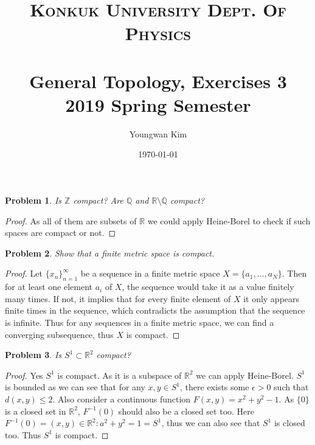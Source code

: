 \documentclass[paper=a4, fontsize=11pt]{scrartcl}
\title{	
	\normalfont \normalsize 
	\textsc{Konkuk University Dept. Of Physics} \\ [25pt] %
	\horrule{1pt} \\[0.4cm] 
	\huge General Topology, Exercises 3 \\
	\vspace{0.1in}
	\Large 2019 Spring Semester
	\horrule{1pt} \\[0.4cm] 
}
\author{Youngwan Kim}
\date{\normalsize\today}
\newcommand{\overbar}[1]{
	\mkern 1.5mu \overline{\mkern-1.5mu\raisebox{0pt}[\dimexpr\height+0.5mm\relax]{$#1$}\mkern-1.5mu}\mkern 1.5mu
}
\newtheorem{problem}{Problem}
\begin{document}
	
\maketitle	
\vspace{0.25in}

\begin{problem}
	Is $\mathbb{Z}$ compact? Are $\mathbb{Q}$ and $\mathbb{R}\setminus\mathbb{Q}$ compact?
\end{problem}

\begin{proof}
	As all of them are subsets of $\mathbb{R}$ we could apply Heine-Borel to check if such spaces are compact or not. 
\end{proof}

\begin{problem}
	Show that a finite metric space is compact.
\end{problem}

\begin{proof}
Let $\{x_n\}_{n=1}^\infty$ be a sequence in a finite metric space $X=\{a_1 ,\dots,a_N \}$. Then for at least one element $a_i$ of $X$, the sequence would take it as a value finitely many times. If not, it implies that for every finite element of $X$ it only appears finite times in the sequence, which contradicts the assumption that the sequence is infinite. Thus for any sequences in a finite metric space, we can find a converging subsequence, thus $X$ is compact.
\end{proof}

\begin{problem}
	Is $S^1 \subset \mathbb{R}^2$ compact?
\end{problem}

\begin{proof}
	Yes $S^1$ is compact. As it is a subspace of $\mathbb{R}^2$ we can apply Heine-Borel. $S^1$ is bounded as we can see that for any $x,y \in S^1$, there exists some $\epsilon>0$ such that $d(x,y)\leq 2$. Also consider a continuous function $F(x,y)=x^2 + y^2 - 1$. As $\{0\}$ is a closed set in $\mathbb{R}^2$, $F^{-1}(0)$ should also be a closed set too. Here $F^{-1}(0)={(x,y)\in\mathbb{R}^2 : a^2 + y^2 = 1}=S^1$, thus we can also see that $S^1$ is closed too. Thus $S^1$ is compact. 
\end{proof}
\end{document}
